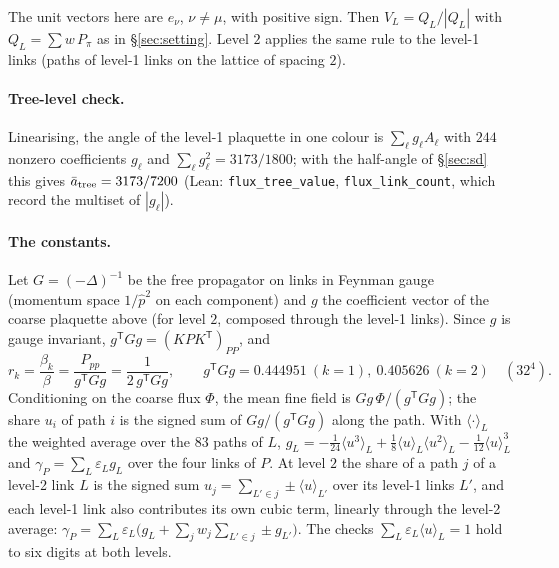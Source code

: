 \documentclass[11pt,a4paper]{article}
\theoremstyle{definition}
\theoremstyle{remark}
\newcommand{\code}[1]{\texttt{#1}}
\newcommand{\abar}{\bar a}
\begin{document}
\noindent The unit vectors here are $e_\nu$, $\nu\ne\mu$, with positive sign. Then $V_L=Q_L/|Q_L|$ with $Q_L=\sum w\,P_{\pi}$ as in \S\ref{sec:setting}. Level $2$ applies the same rule to the level-1 links (paths of level-1 links on the lattice of spacing $2$).

\paragraph{Tree-level check.} Linearising, the angle of the level-1 plaquette in one colour is $\sum_\ell g_\ell A_\ell$ with $244$ nonzero coefficients $g_\ell$ and $\sum_\ell g_\ell^2=3173/1800$; with the half-angle of \S\ref{sec:sd} this gives $\abar_{\rm tree}=3173/7200$ (Lean: \code{flux\_tree\_value}, \code{flux\_link\_count}, which record the multiset of $|g_\ell|$).

\paragraph{The constants.} Let $G=(-\Delta)^{-1}$ be the free propagator on links in Feynman gauge (momentum space $1/\hat p^2$ on each component) and $g$ the coefficient vector of the coarse plaquette above (for level $2$, composed through the level-1 links). Since $g$ is gauge invariant, $g^{\mathsf T}Gg=(KPK^{\mathsf T})_{PP}$, and
\[
r_k=\frac{\beta_k}{\beta}=\frac{P_{pp}}{g^{\mathsf T}Gg}=\frac1{2\,g^{\mathsf T}Gg},\qquad g^{\mathsf T}Gg=0.444951\ (k=1),\ 0.405626\ (k=2)\quad(32^4).
\]
Conditioning on the coarse flux $\Phi$, the mean fine field is $Gg\,\Phi/(g^{\mathsf T}Gg)$; the share $u_i$ of path $i$ is the signed sum of $Gg/(g^{\mathsf T}Gg)$ along the path. With $\langle\cdot\rangle_L$ the weighted average over the 83 paths of $L$, $g_L=-\frac1{24}\langle u^3\rangle_L+\frac18\langle u\rangle_L\langle u^2\rangle_L-\frac1{12}\langle u\rangle_L^3$ and $\gamma_P=\sum_L\varepsilon_Lg_L$ over the four links of $P$. At level $2$ the share of a path $j$ of a level-2 link $L$ is the signed sum $u_j=\sum_{L'\in j}\pm\langle u\rangle_{L'}$ over its level-1 links $L'$, and each level-1 link also contributes its own cubic term, linearly through the level-2 average: $\gamma_P=\sum_L\varepsilon_L\bigl(g_L+\sum_jw_j\sum_{L'\in j}\pm g_{L'}\bigr)$. The checks $\sum_L\varepsilon_L\langle u\rangle_L=1$ hold to six digits at both levels.
\end{document}
